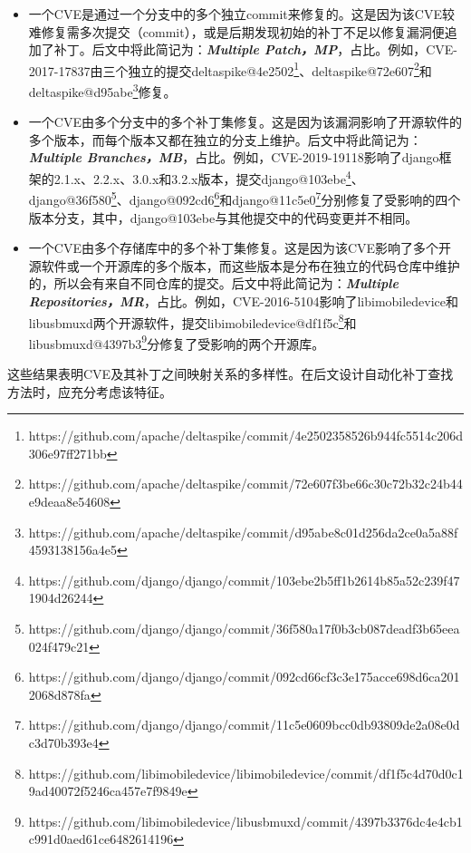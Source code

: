 \begin{itemize}[leftmargin=*]
\item 一个CVE是通过一个分支中的多个独立commit来修复的。这是因为该CVE较难修复需多次提交（commit），或是后期发现初始的补丁不足以修复漏洞便追加了补丁。后文中将此简记为：\textbf{\textit{Multiple Patch，MP}}，占比。例如，CVE-2017-17837由三个独立的提交deltaspike@4e2502\footnote{https://github.com/apache/deltaspike/commit/4e2502358526b944fc5514c206d306e97ff271bb}、deltaspike@72e607\footnote{https://github.com/apache/deltaspike/commit/72e607f3be66c30c72b32c24b44e9deaa8e54608}和\\deltaspike@d95abe\footnote{https://github.com/apache/deltaspike/commit/d95abe8c01d256da2ce0a5a88f4593138156a4e5}修复。
\item 一个CVE由多个分支中的多个补丁集修复。这是因为该漏洞影响了开源软件的多个版本，而每个版本又都在独立的分支上维护。后文中将此简记为：\textbf{\textit{Multiple Branches，MB}}，占比。例如，CVE-2019-19118影响了django框架的2.1.x、2.2.x、3.0.x和3.2.x版本，提交django@103ebe\footnote{https://github.com/django/django/commit/103ebe2b5ff1b2614b85a52c239f471904d26244}、django@36f580\footnote{https://github.com/django/django/commit/36f580a17f0b3cb087deadf3b65eea024f479c21}、django@092cd6\footnote{https://github.com/django/django/commit/092cd66cf3c3e175acce698d6ca2012068d878fa}和django@11c5e0\footnote{https://github.com/django/django/commit/11c5e0609bcc0db93809de2a08e0dc3d70b393e4}分别修复了受影响的四个版本分支，其中，django@103ebe与其他提交中的代码变更并不相同。
\item 一个CVE由多个存储库中的多个补丁集修复。这是因为该CVE影响了多个开源软件或一个开源库的多个版本，而这些版本是分布在独立的代码仓库中维护的，所以会有来自不同仓库的提交。后文中将此简记为：\textbf{\textit{Multiple Repositories，MR}}，占比。例如，CVE-2016-5104影响了libimobiledevice和libusbmuxd两个开源软件，提交libimobiledevice@df1f5c\footnote{https://github.com/libimobiledevice/libimobiledevice/commit/df1f5c4d70d0c19ad40072f5246ca457e7f9849e}和libusbmuxd@4397b3\footnote{https://github.com/libimobiledevice/libusbmuxd/commit/4397b3376dc4e4cb1c991d0aed61ce6482614196}分修复了受影响的两个开源库。

\end{itemize}

这些结果表明CVE及其补丁之间映射关系的多样性。在后文设计自动化补丁查找方法时，应充分考虑该特征。

